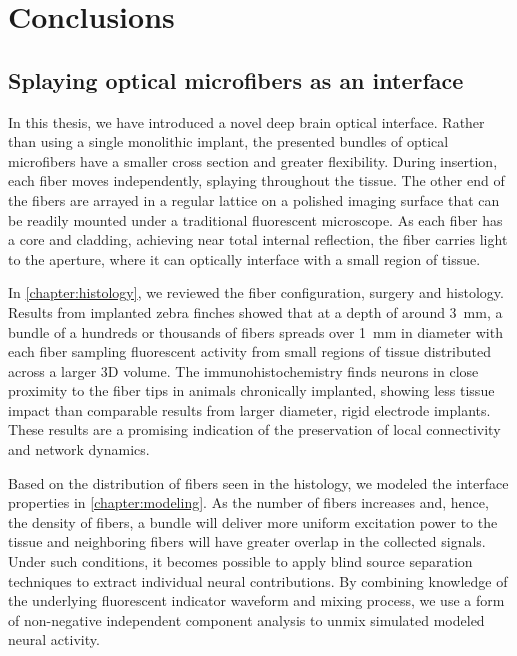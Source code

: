 \chapter{Conclusions}
\label{chapter:Conclusions}

\thispagestyle{myheadings}

\graphicspath{{7_Conclusion/Figures/}}


\section{Splaying optical microfibers as an interface}

In this thesis, we have introduced a novel deep brain 
optical interface. Rather than using a single monolithic 
implant, the presented bundles of optical microfibers 
have a smaller cross section and greater flexibility. 
During insertion, each fiber moves independently, 
splaying throughout the tissue. The other end of the 
fibers are arrayed in a regular lattice on a polished 
imaging surface that can be readily mounted under a 
traditional fluorescent microscope. As each fiber has a 
core and cladding, achieving near total internal 
reflection, the fiber carries light to the aperture, 
where it can optically interface with a small region 
of tissue.

In \cref{chapter:histology}, we reviewed the fiber 
configuration, surgery and histology. Results from 
implanted zebra finches showed that at a depth of around 
3~mm, a bundle of a hundreds or thousands of fibers 
spreads over 1~mm in diameter with each fiber sampling 
fluorescent activity from small regions of tissue 
distributed across a larger 3D volume. The 
immunohistochemistry finds neurons in close proximity 
to the fiber tips in animals chronically implanted, 
showing less tissue impact than comparable results 
from larger diameter, rigid electrode implants. 
These results are a promising indication of the 
preservation of local connectivity and network 
dynamics.

Based on the distribution of fibers seen in the 
histology, we modeled the interface properties 
in \cref{chapter:modeling}. As the number of fibers 
increases and, hence, the density of fibers, a 
bundle will deliver more uniform excitation power 
to the tissue and neighboring fibers will have 
greater overlap in the collected signals. Under 
such conditions, it becomes possible to apply 
blind source separation techniques to extract 
individual neural contributions. By combining 
knowledge of the underlying fluorescent indicator 
waveform and mixing process, we use a form of 
non-negative independent component analysis to 
unmix simulated modeled neural activity.

